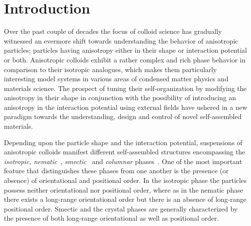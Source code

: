 \documentclass[aps,prl,preprint,superscriptaddress]{revtex4-1}
\begin{document}
\section{Introduction}
Over the past couple of decades the focus of colloid science has gradually witnessed an evermore shift towards understanding the behavior of anisotropic particles; particles having anisotropy either in their shape or interaction potential or both. Anisotropic colloids exhibit a rather complex and rich phase behavior in comparison to their isotropic analogues, which makes them particularly interesting model systems in various areas of condensed matter physics and materials science. The prospect of tuning their self-organization by modifying the anisotropy in their shape in conjunction with the possibility of introducing an anisotropy in the interaction potential using external fields have ushered in a new paradigm towards the understanding, design and control of novel self-assembled materials. \par
Depending upon the particle shape and the interaction potential, suspensions of anisotropic colloids manifest different self-assembled structures encompassing the \emph{isotropic, nematic}~\cite{pizzey2004suspensions, van1998formation, purdy2005nematic, buining1993isotropic, fraden1989isotropic, lemaire2002outstanding, lemaire2004physical, vroege2014biaxial, van2010uniaxial, rossi2010cholesteric, li2016colloidal,dogic2016filamentous}, \emph{smectic}~\cite{davidson2018isotropic, vroege2006smectic, kuijk2012phase} and \emph{columnar} phases~\cite{van2000liquid, brown1999phase, wijnhoven2005sedimentation, van2004liquid, van2005evidence}. One of the most important feature that distinguishes these phases from one another is the presence (or absence) of orientational and positional order. In the isotropic phase the particles possess neither orientational nor positional order, where as in the nematic phase there exists a long-range orientational order but there is an absence of long-range positional order. Smectic and the crystal phases are generally characterized by the presence of both long-range orientational as well as positional order. \par
\end{document}
